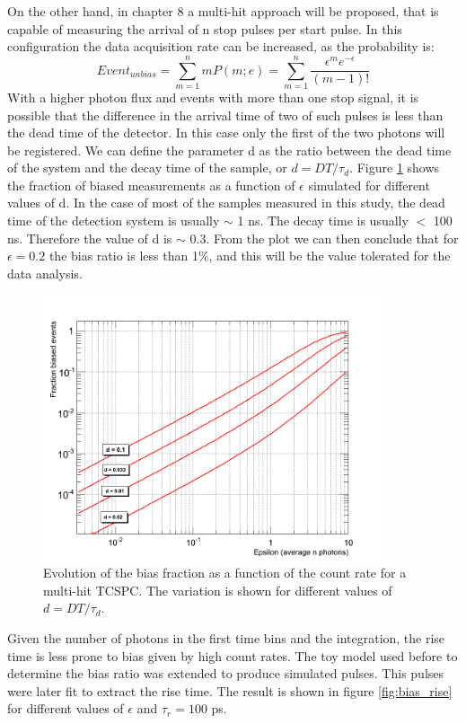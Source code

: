 On the other hand, in chapter 8 a multi-hit approach will be proposed, that is capable of measuring the arrival of n stop pulses per start pulse. In this configuration the data acquisition rate can be increased, as the probability is:
\begin{equation}
Event_{unbias} = \sum _{m = 1}^{n}mP(m;e) = \sum _{m = 1}^{n} \frac{\epsilon ^{m}e^{-\epsilon}}{(m-1)!}
\end{equation}
With a higher photon flux and events with more than one stop signal, it is possible that the difference in the arrival time of two of such pulses is less than the dead time of the detector. In this case only the first of the two photons will be registered. We can define the parameter d as the ratio between the dead time of the system and the decay time of the sample, or $d = DT/\tau _{d}$.
Figure \ref{fig:bias_decay} shows the fraction of biased measurements as a function of $\epsilon$ simulated for different values of d.
In the case of most of the samples measured in this study, the dead time of the detection system is usually $\sim$ 1 ns. The decay time is usually $<$ 100 ns. Therefore the value of d is $\sim$ 0.3. From the plot we can then conclude that for $\epsilon = 0.2 $ the bias ratio is less than 1$\%$, and this will be the value tolerated for the data analysis.
\begin{figure}[htbp]
\begin{center}
\includegraphics[width=10cm]{../Pictures/Chapter_6/bias_function.png}
\end{center}
\caption[Bias fraction in multi hit TCSPC]{Evolution of the bias fraction as a function of the count rate for a multi-hit TCSPC. The variation is shown for different values of $d = DT/\tau _{d}$.}
\label{fig:bias_decay}
\end{figure}
Given the number of photons in the first time bins and the integration, the rise time is less prone to bias given by high count rates. The toy model used before to determine the bias ratio was extended to produce simulated pulses. This pulses were later fit to extract the rise time. The result is shown in figure \ref{fig:bias_rise} for different values of $\epsilon$ and $\tau _{r} = 100$ ps.
